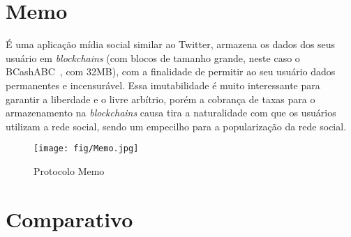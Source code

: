 
\section{Memo}

É uma aplicação mídia social similar ao Twitter, armazena os dados dos seus usuário em \textit{blockchains} (com blocos de tamanho grande, neste caso o BCashABC~\cite{BTCABC}, com 32MB), com a finalidade de permitir ao seu usuário dados permanentes e incensurável.
Essa imutabilidade é muito interessante para garantir a liberdade e o livre arbítrio, porém a cobrança de taxas para o armazenamento na \textit{blockchains} causa tira a naturalidade com que os usuários utilizam a rede social, sendo um empecilho para a popularização da rede social.

\begin{figure}[htb!]
\centering\texttt{[image: fig/Memo.jpg]}
\caption%
        {\label{fig:memo-protocol}Protocolo Memo~\cite{Memo1}}
\end{figure}

\section{Comparativo}

\begin{table}[htb]
\begin{center}
\caption{\label{tab:tab1}Tabela Comparativa das Redes Sociais}
\setlength{\tabcolsep}{.25cm}
\end{center}
\end{table}

